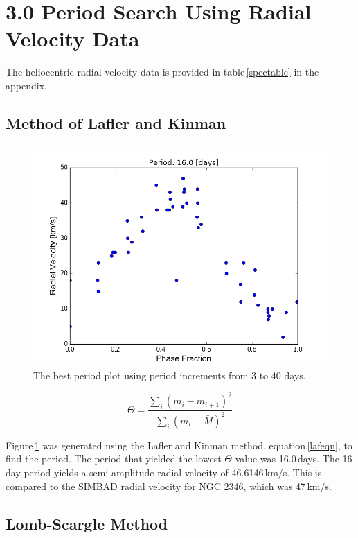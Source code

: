 \documentclass[onecolumn]{aastex6}
\begin{document}
\clearpage
\section{3.0 Period Search Using Radial Velocity Data}
The heliocentric radial velocity data is provided in table\,\ref{spectable} in the appendix.
\subsection{Method of Lafler and Kinman}



\begin{figure}[ht]
  \centering
  \includegraphics[scale=0.3]{period2.png}%
  \caption{The best period plot using period increments from 3 to 40 days.}
  \label{lafler}
\end{figure}

\begin{equation}
\Theta = \frac{\sum_i (m_i - m_{i+1})^2}{\sum_i (m_i - \bar{M})^2}
\label{lafeqn}
\end{equation}


Figure\,\ref{lafler} was generated using the Lafler and Kinman method, equation\,\ref{lafeqn}, to find the period. The period that yielded the lowest $\Theta$ value was 16.0\,days. The 16\,day period yields a semi-amplitude radial velocity of 46.6146\,km/s. This is compared to the SIMBAD radial velocity for NGC 2346, which was 47\,km/s. 

\subsection{Lomb-Scargle Method}
\end{document}
